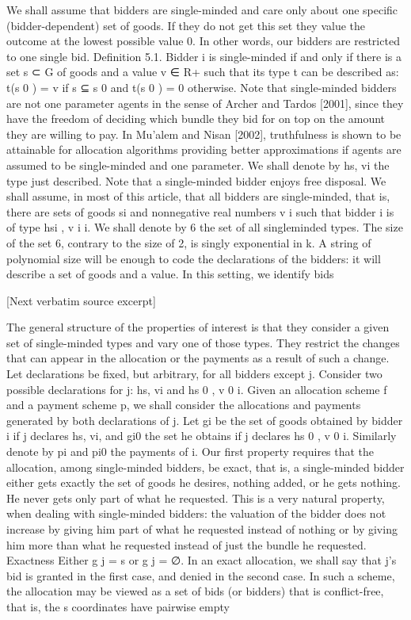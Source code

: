 \documentclass[10pt]{article}
\begin{document}
\begin{ReviewVerbatim}
We shall assume that bidders are single-minded and care only about one specific
(bidder-dependent) set of goods. If they do not get this set they value the outcome
at the lowest possible value 0. In other words, our bidders are restricted to one
single bid.
Definition 5.1. Bidder i is single-minded if and only if there is a set s ⊂ G of
goods and a value v ∈ R+ such that its type t can be described as: t(s 0 ) = v if s ⊆ s 0
and t(s 0 ) = 0 otherwise.
Note that single-minded bidders are not one parameter agents in the sense
of Archer and Tardos [2001], since they have the freedom of deciding which bundle
they bid for on top on the amount they are willing to pay. In Mu’alem and Nisan
[2002], truthfulness is shown to be attainable for allocation algorithms providing
better approximations if agents are assumed to be single-minded and one parameter. We shall denote by hs, vi the type just described. Note that a single-minded
bidder enjoys free disposal. We shall assume, in most of this article, that all bidders
are single-minded, that is, there are sets of goods si and nonnegative real numbers
v i such that bidder i is of type hsi , v i i. We shall denote by 6 the set of all singleminded types. The size of the set 6, contrary to the size of 2, is singly exponential
in k. A string of polynomial size will be enough to code the declarations of the
bidders: it will describe a set of goods and a value. In this setting, we identify bids

[Next verbatim source excerpt]

The general structure of the properties of interest is that they consider a given
set of single-minded types and vary one of those types. They restrict the changes
that can appear in the allocation or the payments as a result of such a change.
Let declarations be fixed, but arbitrary, for all bidders except j. Consider two
possible declarations for j: hs, vi and hs 0 , v 0 i. Given an allocation scheme f and a
payment scheme p, we shall consider the allocations and payments generated by
both declarations of j. Let gi be the set of goods obtained by bidder i if j declares
hs, vi, and gi0 the set he obtains if j declares hs 0 , v 0 i. Similarly denote by pi and pi0
the payments of i.
Our first property requires that the allocation, among single-minded bidders, be
exact, that is, a single-minded bidder either gets exactly the set of goods he desires,
nothing added, or he gets nothing. He never gets only part of what he requested. This
is a very natural property, when dealing with single-minded bidders: the valuation
of the bidder does not increase by giving him part of what he requested instead of
nothing or by giving him more than what he requested instead of just the bundle
he requested.
Exactness Either g j = s or g j = ∅.
In an exact allocation, we shall say that j’s bid is granted in the first case, and denied
in the second case. In such a scheme, the allocation may be viewed as a set of bids
(or bidders) that is conflict-free, that is, the s coordinates have pairwise empty


\end{ReviewVerbatim}
\end{document}
